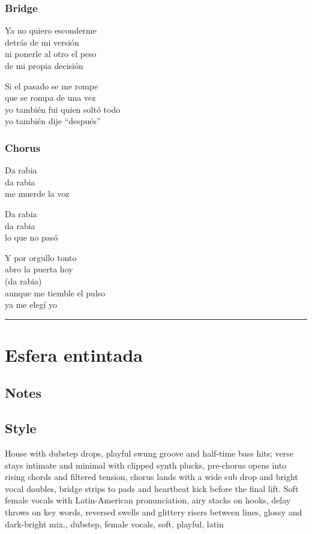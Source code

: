 \documentclass[]{article}
\begin{document}
\subsubsection{Bridge}\label{bridge-11}

Ya no quiero esconderme\\
detrás de mi versión\\
ni ponerle al otro el peso\\
de mi propia decisión

Si el pasado se me rompe\\
que se rompa de una vez\\
yo también fui quien soltó todo\\
yo también dije ``después''

\subsubsection{Chorus}\label{chorus-44}

Da rabia\\
da rabia\\
me muerde la voz

Da rabia\\
da rabia\\
lo que no pasó

Y por orgullo tonto\\
abro la puerta hoy\\
(da rabia)\\
aunque me tiemble el pulso\\
ya me elegí yo

\begin{center}\rule{0.5\linewidth}{0.5pt}\end{center}

\section{Esfera entintada}\label{esfera-entintada}

\subsection{Notes}\label{notes-26}

\subsection{Style}\label{style-26}

House with dubstep drops, playful swung groove and half-time bass hits;
verse stays intimate and minimal with clipped synth plucks, pre-chorus
opens into rising chords and filtered tension, chorus lands with a wide
sub drop and bright vocal doubles, bridge strips to pads and heartbeat
kick before the final lift. Soft female vocals with Latin-American
pronunciation, airy stacks on hooks, delay throws on key words, reversed
swells and glittery risers between lines, glossy and dark-bright mix.,
dubstep, female vocals, soft, playful, latin
\end{document}
